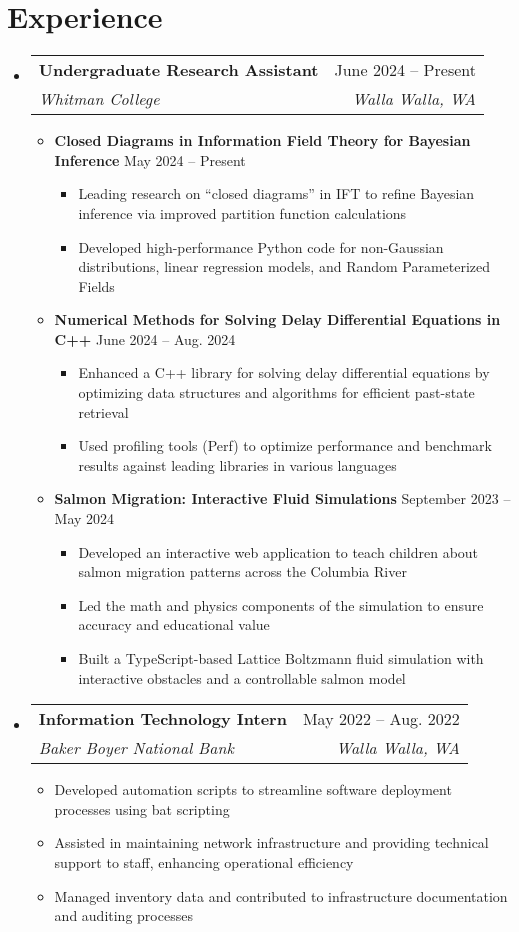 \documentclass[letterpaper,11pt]{article}
\makeatletter
\newcommand{\resumeItem}[1]{\item\small{#1 \vspace{-2pt}}}
\newcommand{\resumeSubheading}[4]{
  \vspace{-2pt}\item
    \begin{tabular*}{0.97\textwidth}[t]{l@{\extracolsep{\fill}}r}
      \textbf{#1} & #2 \\
      \textit{\small#3} & \textit{\small #4} \\
    \end{tabular*}\vspace{-7pt}
}
\newcommand{\resumeSubHeadingListStart}{\begin{itemize}[leftmargin=0.15in, label={}]}
\newcommand{\resumeSubHeadingListEnd}{\end{itemize}}
\newcommand{\resumeItemListStart}{\begin{itemize}}
\newcommand{\resumeItemListEnd}{\end{itemize}\vspace{-5pt}}
\makeatother
\begin{document}
\section{Experience}
  \resumeSubHeadingListStart
    \resumeSubheading
    {Undergraduate Research Assistant}{June 2024 -- Present}
    {Whitman College}{Walla Walla, WA}
    \resumeItemListStart
      \resumeItem{\textbf{Closed Diagrams in Information Field Theory for Bayesian Inference}}\hfill {May 2024 -- Present}
      \resumeItemListStart
          \resumeItem{Leading research on “closed diagrams” in IFT to refine Bayesian inference via improved partition function calculations}
          \resumeItem{Developed high-performance Python code for non-Gaussian distributions, linear regression models, and Random Parameterized Fields}
      \resumeItemListEnd
      \resumeItem{\textbf{Numerical Methods for Solving Delay Differential Equations in C++} \hfill {June 2024 -- Aug. 2024}}
      \resumeItemListStart
          \resumeItem{Enhanced a C++ library for solving delay differential equations by optimizing data structures and algorithms for efficient past-state retrieval}
          \resumeItem{Used profiling tools (Perf) to optimize performance and benchmark results against leading libraries in various languages}
      \resumeItemListEnd
      \resumeItem{\textbf{Salmon Migration: Interactive Fluid Simulations} \hfill {September 2023 -- May 2024}}
      \resumeItemListStart
        \resumeItem{Developed an interactive web application to teach children about salmon migration patterns across the Columbia River}
        \resumeItem{Led the math and physics components of the simulation to ensure accuracy and educational value}
        \resumeItem{Built a TypeScript-based Lattice Boltzmann fluid simulation with interactive obstacles and a controllable salmon model}
    \resumeItemListEnd
    \resumeItemListEnd


    \resumeSubheading
    {Information Technology Intern}{May 2022 -- Aug. 2022}
    {Baker Boyer National Bank}{Walla Walla, WA}
    \resumeItemListStart
      \resumeItem{Developed automation scripts to streamline software deployment processes using bat scripting}
      \resumeItem{Assisted in maintaining network infrastructure and providing technical support to staff, enhancing operational efficiency}
      \resumeItem{Managed inventory data and contributed to infrastructure documentation and auditing processes}
    \resumeItemListEnd
  \resumeSubHeadingListEnd
\end{document}
